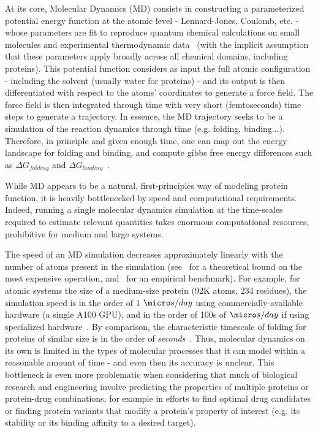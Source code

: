 At its core, Molecular Dynamics (MD) consists in constructing a parameterized potential energy function at the atomic level - Lennard-Jones, Coulomb, etc. -
whose parameters are fit to reproduce quantum chemical calculations on small molecules and experimental thermodynamic data~\citep{hollingsworth_molecular_2018, lopes_current_2015}
(with the implicit assumption that these parameters apply broadly across all chemical domains, including proteins).
This potential function considers as input the full atomic configuration - including the solvent (usually water for proteins) -
and its output is then differentiated with respect to the atoms' coordinates to generate a force field.
The force field is then integrated through time with very short (femtoseconds) time steps to generate a trajectory.
In essence, the MD trajectory seeks to be a simulation of the reaction dynamics through time (e.g. folding, binding...).
Therefore, in principle and given enough time, one can map out the energy landscape for folding and binding, and compute
gibbs free energy differences such as $\Delta G_{folding}$ and $\Delta G_{binding}$~\citep{pan_quantitative_2017}.

While MD appears to be a natural, first-principles way of modeling protein function, it is heavily bottlenecked by
speed and computational requirements. Indeed, running a single molecular dynamics simulation at the time-scales required
to estimate relevant quantities takes enormous computational resources, prohibitive for medium and large systems.

The speed of an MD simulation decreases approximately linearly with the number of atoms present in the simulation
(see~\citep{darden_particle_1993} for a theoretical bound on the most expensive operation, and~\citep{shaw_anton_2021} for an empirical benchmark).
For example, for atomic systems the size of a medium-size protein (92K atoms, 234 residues), the simulation speed is in the order of
1 $\micro s / day$ using commercially-available hardware (a single A100 GPU), and in the order of 100s of $\micro s / day$ if using 
specialized hardware~\citep{shaw_anton_2021}. By comparison, the characteristic timescale of folding for 
proteins of similar size is in the order of \textit{seconds}~\citep{naganathan_scaling_2005}.
Thus, molecular dynamics on its own is limited in the types of molecular
processes that it can model within a reasonable amount of time - and even then its accuracy is unclear.
This bottleneck is even more problematic when considering that much of biological research and engineering involve
predicting the properties of multiple proteins or protein-drug combinations, for example in efforts to find optimal drug candidates
or finding protein variants that modify a protein's property of interest (e.g. its stability or its binding affinity to a desired target).

